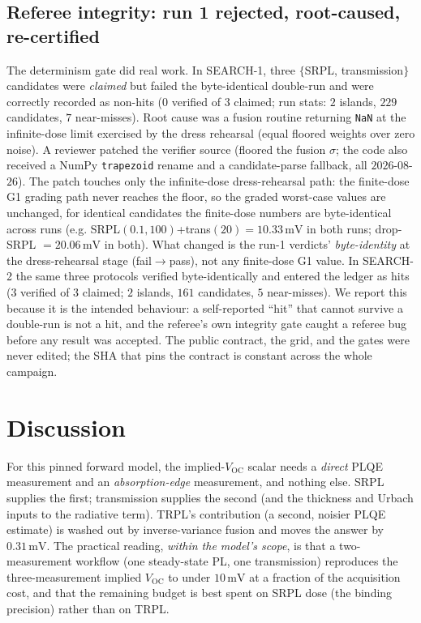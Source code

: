 \documentclass[11pt]{article}
\newcommand{\Voc}{V_{\mathrm{OC}}}
\newcommand{\mV}{\,\mathrm{mV}}
\begin{document}
\subsection{Referee integrity: run 1 rejected, root-caused, re-certified}
\label{sec:integrity}

The determinism gate did real work. In SEARCH-1, three $\{$SRPL, transmission$\}$ candidates were \emph{claimed} but failed the byte-identical double-run and were correctly recorded as non-hits ($0$ verified of $3$ claimed; run stats: $2$ islands, $229$ candidates, $7$ near-misses). Root cause was a fusion routine returning \texttt{NaN} at the infinite-dose limit exercised by the dress rehearsal (equal floored weights over zero noise). A reviewer patched the verifier source (floored the fusion $\sigma$; the code also received a NumPy \texttt{trapezoid} rename and a candidate-parse fallback, all $2026$-$08$-$26$). The patch touches only the infinite-dose dress-rehearsal path: the finite-dose G1 grading path never reaches the floor, so the graded worst-case values are unchanged, for identical candidates the finite-dose numbers are byte-identical across runs (e.g. SRPL$(0.1,100)$+trans$(20)=10.33\mV$ in both runs; drop-SRPL $=20.06\mV$ in both). What changed is the run-1 verdicts' \emph{byte-identity} at the dress-rehearsal stage (fail$\to$pass), not any finite-dose G1 value. In SEARCH-2 the same three protocols verified byte-identically and entered the ledger as hits ($3$ verified of $3$ claimed; $2$ islands, $161$ candidates, $5$ near-misses). We report this because it is the intended behaviour: a self-reported ``hit'' that cannot survive a double-run is not a hit, and the referee's own integrity gate caught a referee bug before any result was accepted. The public contract, the grid, and the gates were never edited; the SHA that pins the contract is constant across the whole campaign.

\section{Discussion}

For this pinned forward model, the implied-$\Voc$ scalar needs a \emph{direct} PLQE measurement and an \emph{absorption-edge} measurement, and nothing else. SRPL supplies the first; transmission supplies the second (and the thickness and Urbach inputs to the radiative term). TRPL's contribution (a second, noisier PLQE estimate) is washed out by inverse-variance fusion and moves the answer by $0.31\mV$. The practical reading, \emph{within the model's scope}, is that a two-measurement workflow (one steady-state PL, one transmission) reproduces the three-measurement implied $\Voc$ to under $10\mV$ at a fraction of the acquisition cost, and that the remaining budget is best spent on SRPL dose (the binding precision) rather than on TRPL.
\end{document}
